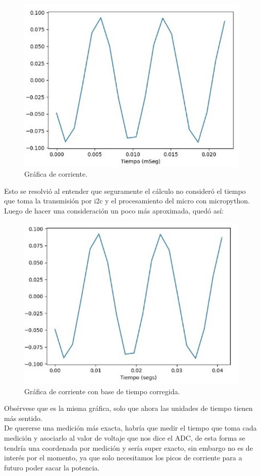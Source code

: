 \begin{figure}[H]
    \centering
    \includegraphics[width=0.75\linewidth]{informes/Screenshot_1.jpg}
    \caption{Gráfica de corriente.}
\end{figure}


Esto se resolvió al entender que seguramente el cálculo no consideró el tiempo que toma la transmisión por i2c y el procesamiento del micro con micropython. Luego de hacer una consideración un poco más aproximada, quedó así:\\

\begin{figure}[H]
    \centering
    \includegraphics[width=0.75\linewidth]{informes/Screenshot_2.jpg}
    \caption{Gráfica de corriente con base de tiempo corregida.}
\end{figure}

Obsérvese que es la misma gráfica, solo que ahora las unidades de tiempo tienen más sentido.\\

De quererse una medición más exacta, habría que medir el tiempo que toma cada medición y asociarlo al valor de voltaje que nos dice el ADC, de esta forma se tendría una coordenada por medición y sería super exacto, sin embargo no es de interés por el momento, ya que solo necesitamos los picos de corriente para a futuro poder sacar la potencia.\\


